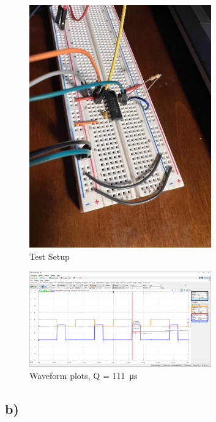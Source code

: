 \documentclass{article}
\begin{document}
	\begin{figure}[H]
	    \centering
	    \includegraphics[width=0.7\textwidth]{3a-setup}
	    \caption{Test Setup}
	\end{figure}
	
	\begin{figure}[H]
	    \centering
	    \includegraphics[width=0.7\textwidth]{3a}
	    \caption{Waveform plots, Q = \SI{111}{\micro\second}}
	\end{figure}

	\subsection*{b)}
\end{document}
